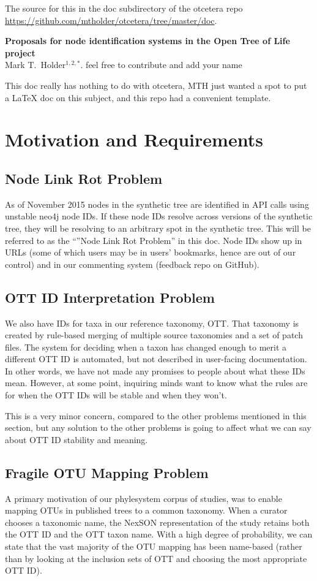 \documentclass[11pt]{article}
\newcommand{\nodeLinkRot}{Node Link Rot Problem\xspace}
\newcommand{\ottIdInterpretation}{OTT ID Interpretation Problem\xspace}
\newcommand{\fragileOTUMapping}{Fragile OTU Mapping Problem\xspace}
\begin{document}
The source for this in the doc subdirectory of the otcetera
    repo \url{https://github.com/mtholder/otcetera/tree/master/doc}.
\begin{center}
    {\bf Proposals for node identification systems in the Open Tree of Life project} \\
{Mark T.~Holder$^{1,2,\ast}$. feel free to contribute and add your name}
\end{center}
This doc really has nothing to do with otcetera, MTH just wanted a spot to
put a \LaTeX\xspace doc on this subject, and this repo had a convenient template.

\tableofcontents
\section{Motivation and Requirements}
\subsection{\nodeLinkRot}
As of November 2015 nodes in the synthetic tree are identified in API calls
    using unstable neo4j node IDs.
If these node IDs resolve across versions of the synthetic tree, they will be
    resolving to an arbitrary spot in the synthetic tree.
This will be referred to as the ``''\nodeLinkRot'' in this doc.
Node IDs show up in URLs (some of which users may be in users' bookmarks, hence
    are out of our control) and in our commenting system (feedback repo on GitHub).

\subsection{\ottIdInterpretation}
We also have IDs for taxa in our reference taxonomy, OTT.
That taxonomy is created by rule-based merging of multiple source taxonomies and
    a set of patch files.
The system for deciding when a taxon has changed enough to merit a different OTT ID
    is automated, but not described in user-facing documentation.
In other words, we have not made any promises to people about what these IDs mean.
However, at some point, inquiring minds want to know what the rules are for when
  the OTT IDs will be stable and when they won't.

This is a very minor concern, compared to the other problems mentioned in this section,
  but any solution to the other problems is going to affect what we can say
  about OTT ID stability and meaning.

\subsection{\fragileOTUMapping}
A primary motivation of our phylesystem corpus of studies, was to enable
  mapping OTUs in published trees to a common taxonomy.
When a curator chooses a taxonomic name, the NexSON representation of the study
  retains both the OTT ID and the OTT taxon name.
With a high degree of probability, we can state that the vast majority of the
  OTU mapping has been name-based (rather than by looking at the inclusion
    sets of OTT and choosing the most appropriate OTT ID).
\end{document}
